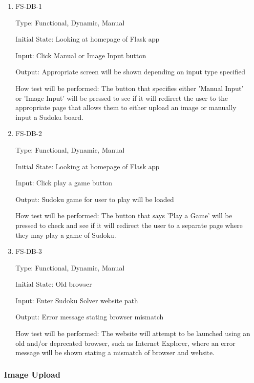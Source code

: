 \documentclass[11pt]{article}
\begin{document}
\begin{enumerate}

\item{FS-DB-1\\}

Type: Functional, Dynamic, Manual
					
Initial State: Looking at homepage of Flask app
					
Input: Click Manual or Image Input button
					
Output: Appropriate screen will be shown depending on input type specified
					
How test will be performed: The button that specifies either 'Manual Input' or 'Image Input' will be pressed to see if it will redirect the user to the appropriate page that allows them to either upload an image or manually input a Sudoku board.
					
\item{FS-DB-2\\}

Type: Functional, Dynamic, Manual
					
Initial State: Looking at homepage of Flask app
					
Input: Click play a game button
					
Output: Sudoku game for user to play will be loaded
					
How test will be performed: The button that says 'Play a Game' will be pressed to check and see if it will redirect the user to a separate page where they may play a game of Sudoku.

\item{FS-DB-3\\}

Type: Functional, Dynamic, Manual
					
Initial State: Old browser
					
Input: Enter Sudoku Solver website path
					
Output: Error message stating browser mismatch
					
How test will be performed: The website will attempt to be launched using an old and/or deprecated browser, such as Internet Explorer, where an error message will be shown stating a mismatch of browser and website.

\end{enumerate}

\subsubsection{Image Upload}
\end{document}
